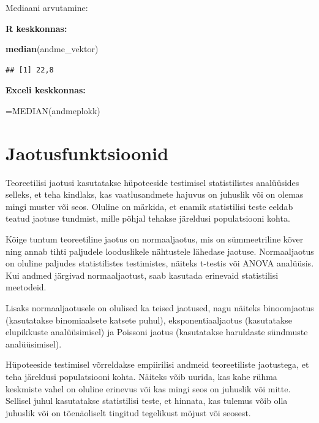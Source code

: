 \documentclass[
]{book}
\newenvironment{Shaded}{\begin{snugshade}}{\end{snugshade}}
\newcommand{\FunctionTok}[1]{\textcolor[rgb]{0.13,0.29,0.53}{\textbf{#1}}}
\newcommand{\NormalTok}[1]{#1}
\renewenvironment{Shaded} {\begin{snugshade}\footnotesize} {\end{snugshade}}
\begin{document}
Mediaani arvutamine:

\textbf{R keskkonnas:}

\begin{Shaded}
\begin{Highlighting}[]
\FunctionTok{median}\NormalTok{(andme\_vektor)}
\end{Highlighting}
\end{Shaded}

\begin{verbatim}
## [1] 22,8
\end{verbatim}

\textbf{Exceli keskkonnas:}

\begin{Shaded}
\begin{Highlighting}[]
\NormalTok{=MEDIAN(andmeplokk)}
\end{Highlighting}
\end{Shaded}

\chapter{Jaotusfunktsioonid}\label{jaotusfunktsioonid}

Teoreetilisi jaotusi kasutatakse hüpoteeside testimisel statistilistes analüüsides selleks, et teha kindlaks, kas vaatlusandmete hajuvus on juhuslik või on olemas mingi muster või seos. Oluline on märkida, et enamik statistilisi teste eeldab teatud jaotuse tundmist, mille põhjal tehakse järeldusi populatsiooni kohta.

Kõige tuntum teoreetiline jaotus on normaaljaotus, mis on sümmeetriline kõver ning annab tihti paljudele looduslikele nähtustele lähedase jaotuse. Normaaljaotus on oluline paljudes statistilistes testimistes, näiteks t-testis või ANOVA analüüsis. Kui andmed järgivad normaaljaotust, saab kasutada erinevaid statistilisi meetodeid.

Lisaks normaaljaotusele on olulised ka teised jaotused, nagu näiteks binoomjaotus (kasutatakse binomiaalsete katsete puhul), eksponentiaaljaotus (kasutatakse elupikkuste analüüsimisel) ja Poissoni jaotus (kasutatakse haruldaste sündmuste analüüsimisel).

Hüpoteeside testimisel võrreldakse empiirilisi andmeid teoreetiliste jaotustega, et teha järeldusi populatsiooni kohta. Näiteks võib uurida, kas kahe rühma keskmiste vahel on oluline erinevus või kas mingi seos on juhuslik või mitte. Sellisel juhul kasutatakse statistilisi teste, et hinnata, kas tulemus võib olla juhuslik või on tõenäoliselt tingitud tegelikust mõjust või seosest.
\end{document}
